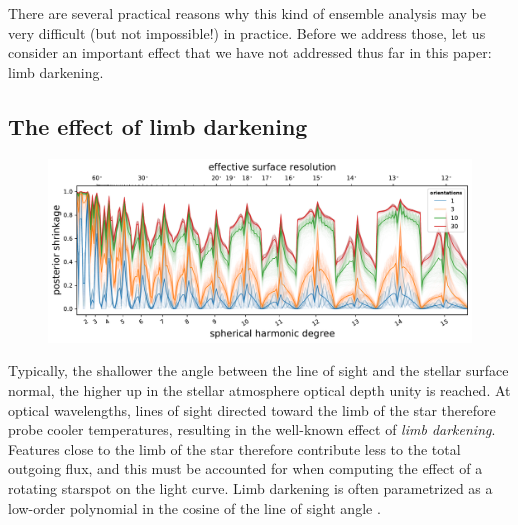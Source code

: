 \documentclass[modern]{aastex62}
\begin{document}
There are several practical reasons why this kind of ensemble analysis
may be very difficult (but not impossible!) in practice. Before
we address those, let us consider an important effect that we have not
addressed thus far in this paper: limb darkening.

\subsection{The effect of limb darkening}
\label{sec:limbdark}

\begin{figure}[t!]
    \begin{centering}
        \includegraphics[width=\linewidth]{figures/nullspace_ensemble_ld.pdf}
    \end{centering}
\end{figure}

Typically, the shallower the angle between the line of sight
and the stellar surface normal, the higher up in the stellar
atmosphere optical depth unity is reached. At optical wavelengths,
lines of sight directed toward the limb of the star therefore
probe cooler temperatures, resulting in the well-known effect of
\emph{limb darkening}. Features close to the limb of the star therefore
contribute less to the total outgoing flux, and this must be
accounted for when computing the effect of a rotating starspot
on the light curve. Limb darkening is often parametrized
as a low-order polynomial in the cosine of the line of sight angle
\citep{Kopal1950}.
\end{document}

